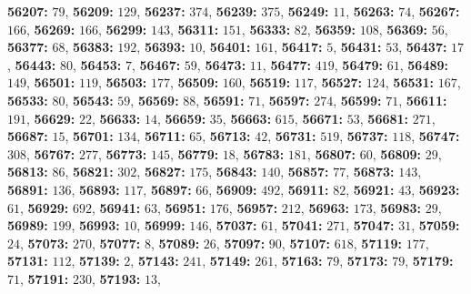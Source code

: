 \textsf{\bfseries 56207:} $79$, \textsf{\bfseries 56209:} $129$, \textsf{\bfseries 56237:} $374$, \textsf{\bfseries 56239:} $375$, \textsf{\bfseries 56249:} $11$, \textsf{\bfseries 56263:} $74$, \textsf{\bfseries 56267:} $166$, \textsf{\bfseries 56269:} $166$, \textsf{\bfseries 56299:} $143$, \textsf{\bfseries 56311:} $151$, \textsf{\bfseries 56333:} $82$, \textsf{\bfseries 56359:} $108$, \textsf{\bfseries 56369:} $56$, \textsf{\bfseries 56377:} $68$, \textsf{\bfseries 56383:} $192$, \textsf{\bfseries 56393:} $10$, \textsf{\bfseries 56401:} $161$, \textsf{\bfseries 56417:} $5$, \textsf{\bfseries 56431:} $53$, \textsf{\bfseries 56437:} $17$, \textsf{\bfseries 56443:} $80$, \textsf{\bfseries 56453:} $7$, \textsf{\bfseries 56467:} $59$, \textsf{\bfseries 56473:} $11$, \textsf{\bfseries 56477:} $419$, \textsf{\bfseries 56479:} $61$, \textsf{\bfseries 56489:} $149$, \textsf{\bfseries 56501:} $119$, \textsf{\bfseries 56503:} $177$, \textsf{\bfseries 56509:} $160$, \textsf{\bfseries 56519:} $117$, \textsf{\bfseries 56527:} $124$, \textsf{\bfseries 56531:} $167$, \textsf{\bfseries 56533:} $80$, \textsf{\bfseries 56543:} $59$, \textsf{\bfseries 56569:} $88$, \textsf{\bfseries 56591:} $71$, \textsf{\bfseries 56597:} $274$, \textsf{\bfseries 56599:} $71$, \textsf{\bfseries 56611:} $191$, \textsf{\bfseries 56629:} $22$, \textsf{\bfseries 56633:} $14$, \textsf{\bfseries 56659:} $35$, \textsf{\bfseries 56663:} $615$, \textsf{\bfseries 56671:} $53$, \textsf{\bfseries 56681:} $271$, \textsf{\bfseries 56687:} $15$, \textsf{\bfseries 56701:} $134$, \textsf{\bfseries 56711:} $65$, \textsf{\bfseries 56713:} $42$, \textsf{\bfseries 56731:} $519$, \textsf{\bfseries 56737:} $118$, \textsf{\bfseries 56747:} $308$, \textsf{\bfseries 56767:} $277$, \textsf{\bfseries 56773:} $145$, \textsf{\bfseries 56779:} $18$, \textsf{\bfseries 56783:} $181$, \textsf{\bfseries 56807:} $60$, \textsf{\bfseries 56809:} $29$, \textsf{\bfseries 56813:} $86$, \textsf{\bfseries 56821:} $302$, \textsf{\bfseries 56827:} $175$, \textsf{\bfseries 56843:} $140$, \textsf{\bfseries 56857:} $77$, \textsf{\bfseries 56873:} $143$, \textsf{\bfseries 56891:} $136$, \textsf{\bfseries 56893:} $117$, \textsf{\bfseries 56897:} $66$, \textsf{\bfseries 56909:} $492$, \textsf{\bfseries 56911:} $82$, \textsf{\bfseries 56921:} $43$, \textsf{\bfseries 56923:} $61$, \textsf{\bfseries 56929:} $692$, \textsf{\bfseries 56941:} $63$, \textsf{\bfseries 56951:} $176$, \textsf{\bfseries 56957:} $212$, \textsf{\bfseries 56963:} $173$, \textsf{\bfseries 56983:} $29$, \textsf{\bfseries 56989:} $199$, \textsf{\bfseries 56993:} $10$, \textsf{\bfseries 56999:} $146$, \textsf{\bfseries 57037:} $61$, \textsf{\bfseries 57041:} $271$, \textsf{\bfseries 57047:} $31$, \textsf{\bfseries 57059:} $24$, \textsf{\bfseries 57073:} $270$, \textsf{\bfseries 57077:} $8$, \textsf{\bfseries 57089:} $26$, \textsf{\bfseries 57097:} $90$, \textsf{\bfseries 57107:} $618$, \textsf{\bfseries 57119:} $177$, \textsf{\bfseries 57131:} $112$, \textsf{\bfseries 57139:} $2$, \textsf{\bfseries 57143:} $241$, \textsf{\bfseries 57149:} $261$, \textsf{\bfseries 57163:} $79$, \textsf{\bfseries 57173:} $79$, \textsf{\bfseries 57179:} $71$, \textsf{\bfseries 57191:} $230$, \textsf{\bfseries 57193:} $13$, 
